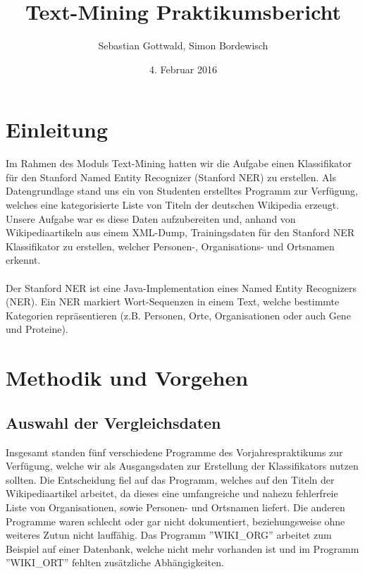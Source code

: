 \documentclass[a4paper]{article}
\author{Sebastian Gottwald, Simon Bordewisch}
\title{Text-Mining Praktikumsbericht}
\date{4. Februar 2016}
\begin{document}
\begin{titlepage}
\maketitle
\end{titlepage}

\section{Einleitung}
	Im Rahmen des Moduls Text-Mining hatten wir die Aufgabe einen Klassifikator für den Stanford Named Entity Recognizer (Stanford NER) zu erstellen.
	Als Datengrundlage stand uns ein von Studenten erstelltes Programm zur Verfügung, welches eine kategorisierte Liste von Titeln der deutschen Wikipedia erzeugt.
	Unsere Aufgabe war es diese Daten aufzubereiten und, anhand von Wikipediaartikeln aus einem XML-Dump, Trainingsdaten für den Stanford NER Klassifikator zu erstellen, welcher Personen-, Organisations- und Ortsnamen erkennt.
	\\\\
	Der Stanford NER ist eine Java-Implementation eines Named Entity Recognizers (NER).
	Ein NER markiert Wort-Sequenzen in einem Text, welche bestimmte Kategorien repräsentieren (z.B. Personen, Orte, Organisationen oder auch Gene und Proteine).
\section{Methodik und Vorgehen}
	\subsection{Auswahl der Vergleichsdaten}
		Insgesamt standen fünf verschiedene Programme des Vorjahrespraktikums zur Verfügung, welche wir als Ausgangsdaten zur Erstellung der Klassifikators nutzen sollten.
		Die Entscheidung fiel auf das Programm, welches auf den Titeln der Wikipediaartikel arbeitet, da dieses eine umfangreiche und nahezu fehlerfreie Liste von Organisationen, sowie Personen- und Ortsnamen liefert.
		Die anderen Programme waren schlecht oder gar nicht dokumentiert, beziehungsweise ohne weiteres Zutun nicht lauffähig.
		Das Programm ''WIKI\_ORG'' arbeitet zum Beispiel auf einer Datenbank, welche nicht mehr vorhanden ist und im Programm ''WIKI\_ORT'' fehlten zusätzliche Abhängigkeiten.
\end{document}
